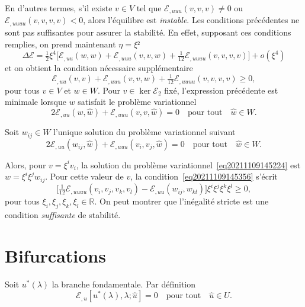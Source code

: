 \documentclass[12pt, final]{amsart}
\begin{document}
En d'autres termes, s'il existe \(v\in V\) tel que \(\mathcal E_{,uuu}(v, v, v)\neq0\) ou
\(\mathcal E_{,uuuu}(v, v, v, v)<0\), alors l'équilibre est \emph{instable}. Les
conditions précédentes ne sont pas suffisantes pour assurer la stabilité. En
effet, supposant ces conditions remplies, on prend maintenant \(\eta =\xi ²\)
\begin{equation}
  \Delta \mathcal E=\tfrac12\xi ^4\bigl[\mathcal E_{,uu}(w, w)+\mathcal E_{,uuu}(v, v, w)
  +\tfrac1{12}\mathcal E_{,uuuu}(v, v, v, v)\bigr]+o(\xi ^4)
\end{equation}
et on obtient la condition nécessaire supplémentaire
\begin{equation}
  \label{eq20211109145356}
  \mathcal E_{,uu}(v, v)+\mathcal E_{,uuu}(v, v, w)+\tfrac1{12}\mathcal E_{,uuuu}(v, v, v, v)\geq0,
\end{equation}
pour tous \(v\in V\) et \(w\in W\). Pour \(v\in\ker\mathcal E_2\) fixé, l'expression précédente
est minimale lorsque \(w\) satisfait le problème variationnel
\begin{equation}
  \label{eq20211109145224}
  2\mathcal E_{,uu}(w, \hat{w})+\mathcal E_{,uuu}(v, v, \hat{w})=0\quad\text{pour tout}\quad\hat{w}\in W.
\end{equation}

Soit \(w_{ij}\in W\) l'unique solution du problème variationnel suivant
\begin{equation}
  \label{eq20211221155859}
  2\mathcal E_{,uu}(w_{ij}, \hat{w})+\mathcal E_{,uuu}(v_i, v_j, \hat{w})=0\quad\text{pour tout}\quad\hat{w}\in W.
\end{equation}

Alors, pour \(v=\xi ^i v_i\), la solution du problème
variationnel~\eqref{eq20211109145224} est \(w=\xi ^i\xi ^jw_{ij}\). Pour cette
valeur de \(v\), la condition~\eqref{eq20211109145356} s'écrit
\begin{equation}
  \bigl[\tfrac1{12}\mathcal E_{,uuuu}(v_i, v_j, v_k, v_l)-\mathcal E_{,uu}(w_{ij}, w_{kl})\bigr]\xi ^i\xi ^j\xi ^k\xi ^l\geq0,
\end{equation}
pour tous \(\xi _i, \xi _j, \xi _k, \xi _l\in\mathbb R \). On peut montrer que l'inégalité stricte est
une condition \emph{suffisante} de stabilité.

\section{Bifurcations}

Soit \(u^*(\lambda )\) la branche fondamentale. Par définition
\begin{equation}
  \mathcal E_{,u}[u^*(\lambda ), \lambda ;\hat{u}]=0\quad\text{pour tout}\quad\hat{u}\in U.
\end{equation}
\end{document}
